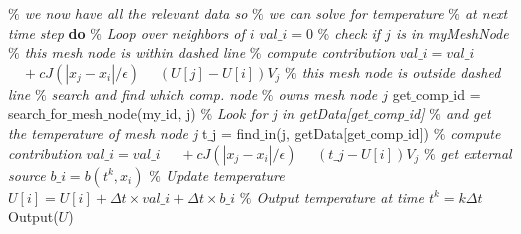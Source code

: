 \documentclass[11pt,twocolumn]{amsart}
\theoremstyle{definition}
\theoremstyle{definition}
\numberwithin{equation}{section}
\numberwithin{equation}{section}
\begin{document}
\begin{algorithm}
	\begin{algorithmic}[1]
			\STATE \textcolor{mygray}{\it $\%$ we now have all the relevant data so}
			\STATE \textcolor{mygray}{\it $\%$ we can solve for temperature}
			\STATE \textcolor{mygray}{\it $\%$ at next time step}
			 \textbf{do}
				\STATE \textcolor{mygray}{\it $\%$ Loop over neighbors of $i$}
				\STATE $val\_i = 0$
					\STATE \textcolor{mygray}{\it $\%$ check if $j$ is in myMeshNode}
						\STATE \textcolor{mygray}{\it $\%$ this mesh node is within dashed line}
						\STATE
						\STATE \textcolor{mygray}{\it $\%$ compute contribution}
						\STATE $val\_i = val\_i $
						\STATE $\quad +  c J(|x_j - x_i|/\epsilon)$
						\STATE $\quad (U[j] - U[i])V_j$
					\ELSE 
						\STATE \textcolor{mygray}{\it $\%$ this mesh node is outside dashed line}
						\STATE \textcolor{mygray}{\it $\%$ search and find which comp. node }
						\STATE \textcolor{mygray}{\it $\%$ owns mesh node $j$}
						\STATE get$\_$comp$\_$id = 
						\STATE \; search$\_$for$\_$mesh$\_$node(my$\_$id, j)
						\STATE
						\STATE \textcolor{mygray}{\it $\%$ Look for j in getData[get$\_$comp$\_$id]}
						\STATE \textcolor{mygray}{\it $\%$ and get the temperature of mesh node j}			
						\STATE t$\_$j = find$\_$in(j, getData[get$\_$comp$\_$id])
						\STATE
						\STATE \textcolor{mygray}{\it $\%$ compute contribution}
						\STATE $val\_i = val\_i $
						\STATE $\quad +  c J(|x_j - x_i|/\epsilon)$
						\STATE $\quad (t\_j - U[i])V_j$	
					\ENDIF
				\ENDFOR
				\STATE \textcolor{mygray}{\it $\%$ get external source}
				\STATE $b\_i = b(t^k, x_i)$
				\STATE \textcolor{mygray}{\it $\%$ Update temperature}
				\STATE $U[i] = U[i] + \Delta t \times val\_i + \Delta t \times b\_i$
			\EndHloop	
			\STATE \textcolor{mygray}{\it $\%$ Output temperature at time $t^k = k\Delta t$}
			\STATE Output($U$)
		\ENDFOR
	\end{algorithmic}
\end{algorithm}

\FloatBarrier
%
%
\end{document}
